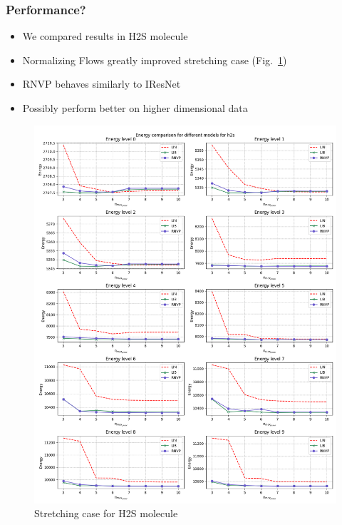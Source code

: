 \begin{frame}
    \frametitle{Performance?}
    \begin{itemize}
        \item We compared results in H2S molecule
        \item Normalizing Flows greatly improved stretching case (Fig.~\ref{fig:enrs_stretch_2D})
        \item RNVP behaves similarly to IResNet
        \item Possibly perform better on higher dimensional data
    \end{itemize}
    \begin{figure}
        \includegraphics[scale=0.5]{img/enrs_stretch_2D.png}
        \caption{Stretching case for H2S molecule}
        \label{fig:enrs_stretch_2D}
    \end{figure}
\end{frame}